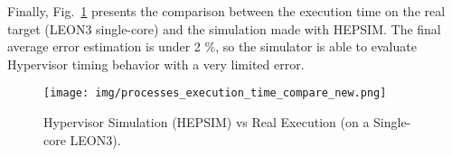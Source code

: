 %
Finally, Fig.~\ref{fig1_tasks_comparison} presents the comparison between the execution time on the real target (LEON3 single-core) and the simulation made with HEPSIM. The final average error estimation is under 2 \%, so the simulator is able to evaluate Hypervisor timing behavior with a very limited error. 
%
\begin{figure}[htbp]
\centerline{\texttt{[image: img/processes\_execution\_time\_compare\_new.png]}}
\caption{Hypervisor Simulation (HEPSIM) vs Real Execution (on a Single-core LEON3).}
\label{fig1_tasks_comparison}
\end{figure}
%